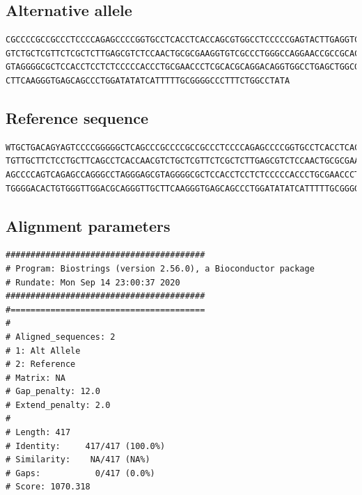 \documentclass[UTF8,a4paper,landscape]{ctexart}\usepackage[]{graphicx}\usepackage[]{color}
\makeatletter
\newenvironment{kframe}{%
 \def\at@end@of@kframe{}%
 \ifinner\ifhmode%
  \def\at@end@of@kframe{\end{minipage}}%
  \begin{minipage}{\columnwidth}%
 \fi\fi%
 \def\FrameCommand##1{\hskip\@totalleftmargin \hskip-\fboxsep
 \colorbox{shadecolor}{##1}\hskip-\fboxsep
     \hskip-\linewidth \hskip-\@totalleftmargin \hskip\columnwidth}%
 \MakeFramed {\advance\hsize-\width
   \@totalleftmargin\z@ \linewidth\hsize
   \@setminipage}}%
 {\par\unskip\endMakeFramed%
 \at@end@of@kframe}
\newenvironment{knitrout}{}{} %
\makeatother
\begin{document}
\subsection*{Alternative allele}
\begin{knitrout}
\color{fgcolor}\begin{kframe}
\begin{verbatim}
CGCCCCGCCGCCCTCCCCAGAGCCCCGGTGCCTCACCTCACCAGCGTGGCCTCCCCCGAGTACTTGAGGTCTTCCAGCTCCCGCTGCAGTTGTTGCTTCTCCTGCTTCAGCCTCACCAAC
GTCTGCTCGTTCTCGCTCTTGAGCGTCTCCAACTGCGCGAAGGTGTCGCCCTGGGCCAGGAACCGCCGCACCAACGACTGCGGGCCACCCAGCCCCAGTCAGAGCCAGGGCCTAGGGAGC
GTAGGGGCGCTCCACCTCCTCTCCCCCACCCTGCGAACCCTCGCACGCAGGACAGGTGGCCTGAGCTGGCGCCTTTTGCACAGCAATGTATGGGGACACTGTGGGTTGGACGCAGGGTTG
CTTCAAGGGTGAGCAGCCCTGGATATATCATTTTTGCGGGGCCCTTTCTGGCCTATA
\end{verbatim}
\end{kframe}
\end{knitrout}

\subsection*{Reference sequence}
\begin{knitrout}
\color{fgcolor}\begin{kframe}
\begin{verbatim}
WTGCTGACAGYAGTCCCCGGGGGCTCAGCCCGCCCCGCCGCCCTCCCCAGAGCCCCGGTGCCTCACCTCACCAGCGTGGCCTCCCCCGAGTACTTGAGGTCTTCCAGCTCCCGCTGCAGT
TGTTGCTTCTCCTGCTTCAGCCTCACCAACGTCTGCTCGTTCTCGCTCTTGAGCGTCTCCAACTGCGCGAAGGTGTCGCCCTGGGCCAGGAACCGCCGCACCAACGACTGCGGGCCACCC
AGCCCCAGTCAGAGCCAGGGCCTAGGGAGCGTAGGGGCGCTCCACCTCCTCTCCCCCACCCTGCGAACCCTCGCACGCAGGACAGGTGGCCTGAGCTGGCGCCTTTTGCACAGCAATGTA
TGGGGACACTGTGGGTTGGACGCAGGGTTGCTTCAAGGGTGAGCAGCCCTGGATATATCATTTTTGCGGGGCCCTTTCTGGCCTATATAAGGAATTTGAGTCAGCCTCAAACTCGAT
\end{verbatim}
\end{kframe}
\end{knitrout}

\subsection*{Alignment parameters}
\begin{knitrout}
\color{fgcolor}\begin{kframe}
\begin{verbatim}
########################################
# Program: Biostrings (version 2.56.0), a Bioconductor package
# Rundate: Mon Sep 14 23:00:37 2020
########################################
#=======================================
#
# Aligned_sequences: 2
# 1: Alt Allele
# 2: Reference
# Matrix: NA
# Gap_penalty: 12.0
# Extend_penalty: 2.0
#
# Length: 417
# Identity:     417/417 (100.0%)
# Similarity:    NA/417 (NA%)
# Gaps:           0/417 (0.0%)
# Score: 1070.318
\end{verbatim}
\end{kframe}
\end{knitrout}
\end{document}
